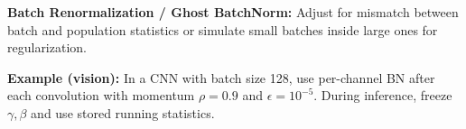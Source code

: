 \textbf{Batch Renormalization / Ghost BatchNorm:} Adjust for mismatch between batch and population statistics or simulate small batches inside large ones for regularization.

\begin{example}
\textbf{Example (vision):} In a CNN with batch size 128, use per-channel BN after each convolution with momentum $\rho=0.9$ and $\epsilon=10^{-5}$. During inference, freeze $\gamma,\beta$ and use stored running statistics.
\end{example}


